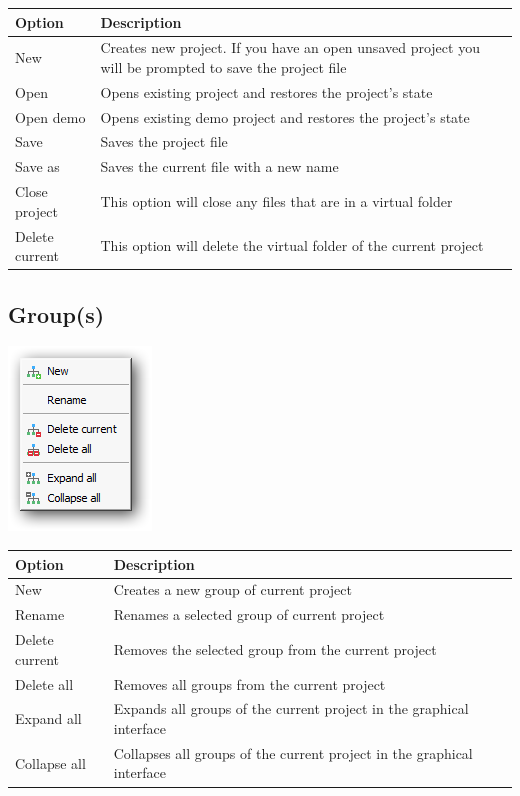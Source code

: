 \begin{scriptsize}\begin{tabularx}{\textwidth}{>{\hsize=0.2\hsize}X>{\hsize=0.8\hsize}X}\\
    \hline
    \textbf{Option} & \textbf{Description} \\
    \hline
    New & Creates new project. If you have an open unsaved project you will be prompted to save the project file \\
    Open & Opens existing project and restores the project's state \\
    Open demo & Opens existing demo project and restores the project's state \\
    Save & Saves the project file \\
    Save as & Saves the current file with a new name \\
    Close project & This option will close any files that are in a virtual folder \\
    Delete current & This option will delete the virtual folder of the current project \\
    \hline
  \end{tabularx}\end{scriptsize}


\newpage
\hypertarget{menu_project_group}{}
\subsection{Group(s)}

\includegraphics[scale=0.50]{./res/menu_project_group.png}\\

\begin{scriptsize}\begin{tabularx}{\textwidth}{>{\hsize=0.2\hsize}X>{\hsize=0.8\hsize}X}\\
    \hline
    \textbf{Option} & \textbf{Description} \\
    \hline
    New & Creates a new group of current project \\
    Rename & Renames a selected group of current project \\
    Delete current & Removes the selected group from the current project \\
    Delete all & Removes all groups from the current project \\
    Expand all & Expands all groups of the current project in the graphical interface \\
    Collapse all & Collapses all groups of the current project in the graphical interface \\
    \hline
  \end{tabularx}\end{scriptsize}



